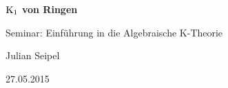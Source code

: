 \documentclass[paper=a4, twoside=false, twocolumn=false, ngerman, fontsize=10pt, titlepage=false, parskip=half, abstract=false,toc=listof]{scrartcl}
\begin{document}


\begin{titlepage}
  \begin{center}
  \centerline{\textbf{\Huge $\operatorname{K_1}$ von Ringen}}
  \vspace{1em}                    
  \centerline{\Large Seminar: Einführung in die Algebraische K-Theorie}
  \vspace{1em}
  \centerline{\Large Julian Seipel}
  \vspace{0.5cm}
  \centerline{27.05.2015}
  \vspace{2cm}
\end{center}
\end{titlepage}




\tableofcontents



%
%
%


\end{document}
